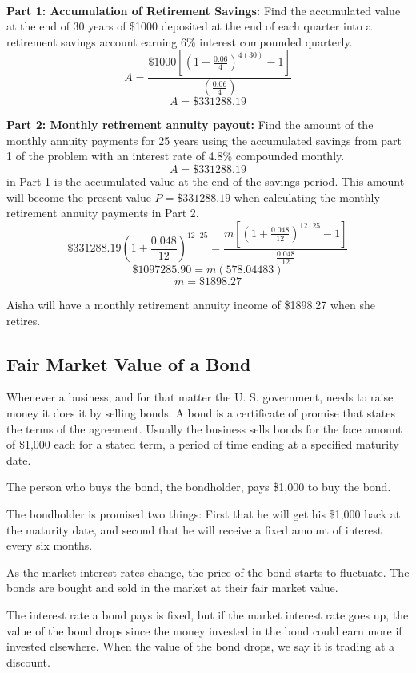 \begin{solution}~

    \textbf{Part 1: Accumulation of Retirement Savings:} Find the accumulated value at the end of 30 years of \$1000 deposited at the end of each quarter into a retirement savings account earning 6\% interest compounded quarterly.
    \[ A = \frac{\$1000\left[\left(1 + \frac{0.06}{4}\right)^{4 (30)} - 1\right]}{\left(\frac{0.06}{4}\right)} \]
    \[ A = \$331288.19 \]

    \textbf{Part 2: Monthly retirement annuity payout:} Find the amount of the monthly annuity payments for 25 years using the accumulated savings from part 1 of the problem with an interest rate of 4.8\% compounded monthly.
    \[ A = \$331288.19 \] in Part 1 is the accumulated value at the end of the savings period. This amount will become the present value \( P = \$331288.19 \) when calculating the monthly retirement annuity payments in Part 2.
    \[
        \$331288.19\left(1 + \frac{0.048}{12}\right)^{12 \cdot 25} = \frac{m\left[\left(1 + \frac{0.048}{12}\right)^{12 \cdot 25} - 1\right]}{\frac{0.048}{12}}
    \]
    \[\$1097285.90 = m(578.04483) \]
    \[ m = \$1898.27 \]

    Aisha will have a monthly retirement annuity income of \$1898.27 when she retires.
\end{solution}

\subsection{Fair Market Value of a Bond}

Whenever a business, and for that matter the U. S. government, needs to raise money it does it by selling bonds.  A bond is a certificate of promise that states the terms of the agreement.  Usually the business sells bonds for the face amount of \$1,000 each for a stated term, a period of time ending at a specified maturity date.

The person who buys the bond, the bondholder, pays \$1,000 to buy the bond.

The bondholder is promised two things: First that he will get his \$1,000 back at the maturity date, and second that he will receive a fixed amount of interest every six months.

As the market interest rates change, the price of the bond starts to fluctuate.  The bonds are bought and sold in the market at their fair market value.

The interest rate a bond pays is fixed, but if the market interest rate goes up, the value of the bond drops since the money invested in the bond could earn more if invested elsewhere.  When the value of the bond drops, we say it is trading at a discount.

